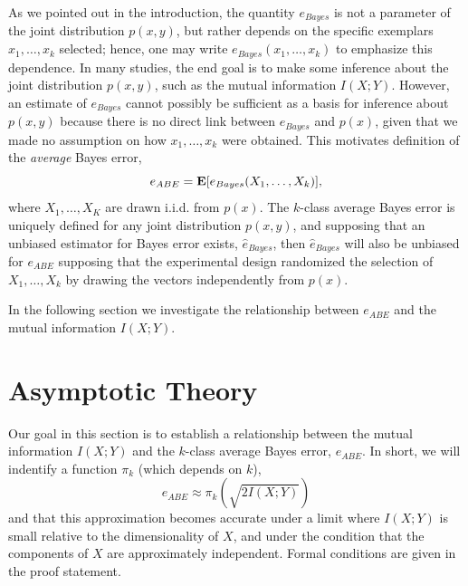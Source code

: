 \documentclass[12pt]{article}
\begin{document}
As we pointed out in the introduction, the quantity $e_{Bayes}$ is not
a parameter of the joint distribution $p(x, y)$, but rather depends on
the specific exemplars $x_1,\hdots, x_k$ selected; hence, one may
write $e_{Bayes}(x_1,\hdots, x_k)$ to emphasize this dependence.  In
many studies, the end goal is to make some inference about the joint
distribution $p(x, y)$, such as the mutual information $I(X; Y)$.
However, an estimate of $e_{Bayes}$ cannot possibly be sufficient as a
basis for inference about $p(x, y)$ because there is no direct link
between $e_{Bayes}$ and $p(x)$, given that we made no assumption on
how $x_1,\hdots, x_k$ were obtained.  This motivates definition of
the \emph{average} Bayes error,
\[
e_{ABE} = \textbf{E}[e_{Bayes}(X_1,\hdots, X_k)],
\]
where $X_1,\hdots, X_K$ are drawn i.i.d. from $p(x)$.
The $k$-class average Bayes error is uniquely defined for any joint distribution $p(x, y)$,
and supposing that an unbiased estimator for Bayes error exists, $\hat{e}_{Bayes}$,
then $\hat{e}_{Bayes}$ will also be unbiased for $e_{ABE}$ supposing that the experimental design randomized the selection of $X_1,\hdots, X_k$
by drawing the vectors independently from $p(x)$.

In the following section we investigate the relationship between $e_{ABE}$ and the mutual information $I(X; Y)$.

\section{Asymptotic Theory}

Our goal in this section is to establish a relationship between the
mutual information $I(X; Y)$ and the $k$-class average Bayes error,
$e_{ABE}$.  In short, we will indentify a function $\pi_k$
(which depends on $k$),
\[
e_{ABE} \approx \pi_k(\sqrt{2 I(X; Y)})
\]
and that this approximation becomes accurate under a limit where $I(X; Y)$ is small relative to the dimensionality of $X$,
and under the condition that the components of $X$ are approximately independent.  Formal conditions are given in the proof statement.
\end{document}
